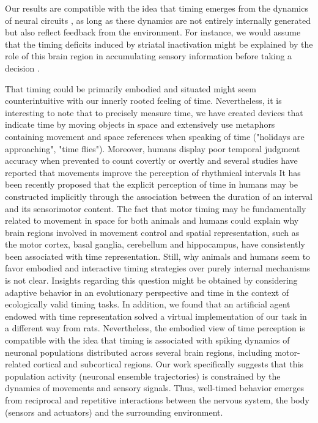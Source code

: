 Our results are compatible with the idea that timing emerges from the dynamics of neural circuits \cite{Paton2018Neuron,Goel2014PhilTrans}, as long as these dynamics are not entirely internally generated but also reflect feedback from the environment.
For instance, we would assume that the timing deficits induced by striatal inactivation \cite{Rueda2015NatNeuro} might be explained by the role of this brain region in accumulating sensory information before taking a decision \cite{Yartsev2018eLife,Dunovan2016FrontNeuro}.
\par
That timing could be primarily embodied and situated might seem counterintuitive with our innerly rooted feeling of time.
Nevertheless, it is interesting to note that to precisely measure time, we have created devices that indicate time by moving objects in space and extensively use metaphors containing movement and space references when speaking of time ("holidays are approaching", "time flies")\cite{Nunez2013TICS,Winter2015Cortex}.
Moreover, humans display poor temporal judgment accuracy when prevented to count covertly or overtly\cite{Rattat2012} and several studies have reported that movements improve the perception of rhythmical intervals\cite{Su2012,Manning2013,Wiener2019eNeuro}
It has been recently proposed that the explicit perception of time in humans may be constructed implicitly through the association between the duration of an interval and its sensorimotor content\cite{Coull2018TICS}.
The fact that motor timing may be fundamentally related to movement in space for both animals and humans could explain why brain regions involved in movement control and spatial representation, such as the motor cortex, basal ganglia, cerebellum and hippocampus, have consistently been associated with time representation\cite{pouthas2005HumBrainMapp, Kraus2013Neuron, Bakhurin2017JNeurosci, Morillon2017PNAS, Gu2018NeurobLearnMem, Mello2015CurBio, Villette2015, Pastalkova2008, Schubotz2000}.
Still, why animals and humans seem to favor embodied and interactive timing strategies over purely internal mechanisms is not clear.
Insights regarding this question might be obtained by considering adaptive behavior in an evolutionary perspective\cite{Cisek2019} and time in the context of ecologically valid timing tasks\cite{vanRijn2018}.
In addition, we found that an artificial agent endowed with time representation solved a virtual implementation of our task in a different way from rats.
Nevertheless, the embodied view of time perception is compatible with the idea that timing is associated with spiking dynamics of neuronal populations distributed across several brain regions, including motor-related cortical and subcortical regions\cite{Paton2018Neuron,Goel2014PhilTrans}.
Our work specifically suggests that this population activity (neuronal ensemble trajectories) is constrained by the dynamics of movements and sensory signals.
Thus, well-timed behavior emerges from reciprocal and repetitive interactions between the nervous system, the body (sensors and actuators) and the surrounding environment. 

